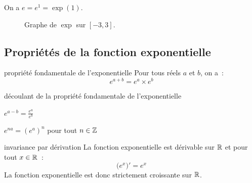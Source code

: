\begin{remarque}{}{}
    On a $e = e^1 = \exp(1)$.
\end{remarque}

\begin{figure}[ht]
    \centering
    \caption{Graphe de $\exp$ sur $[-3,3]$.}
\end{figure}

\subsection{Propriétés de la fonction exponentielle}

\begin{theoreme}{}{propriété fondamentale de l'exponentielle}
    Pour tous réels $a$ et $b$, on a~:
    $$e^{a+b} = e^a \times e^b$$
\end{theoreme}

\begin{proposition}{}{découlant de la propriété fondamentale de l'exponentielle}
    \begin{enumeratebf}
        \item $e^{a-b} = \frac{e^a}{e^b}$
        \item $e^{na} = (e^a)^n$ pour tout $n \in \mathbb{Z}$
    \end{enumeratebf}
\end{proposition}

\begin{proposition}{}{invariance par dérivation}
    La fonction exponentielle est dérivable sur $\mathbb{R}$ et pour tout $x \in \mathbb{R}$~:
    $$\big(e^x\big)' = e^x$$
    La fonction exponentielle est donc strictement croissante sur $\mathbb{R}$.
\end{proposition}

